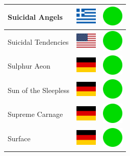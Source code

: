 \documentclass[12pt, a4paper, twoside]{report}
\begin{document}
\begin{center}
\begin{longtable}{|p{5cm}|p{2cm}|p{2cm}|}
Suicidal Angels & \includegraphics[width=1cm]{4x3/gr} & \includegraphics[width=1cm]{likes/y} \\ \hline
Suicidal Tendencies & \includegraphics[width=1cm]{4x3/us} & \includegraphics[width=1cm]{likes/y} \\ \hline
Sulphur Aeon & \includegraphics[width=1cm]{4x3/de} & \includegraphics[width=1cm]{likes/y} \\ \hline
Sun of the Sleepless & \includegraphics[width=1cm]{4x3/de} & \includegraphics[width=1cm]{likes/y} \\ \hline
Supreme Carnage & \includegraphics[width=1cm]{4x3/de} & \includegraphics[width=1cm]{likes/y} \\ \hline
Surface & \includegraphics[width=1cm]{4x3/de} & \includegraphics[width=1cm]{likes/y} \\ \hline

\end{longtable}
\end{center}
\end{document}
